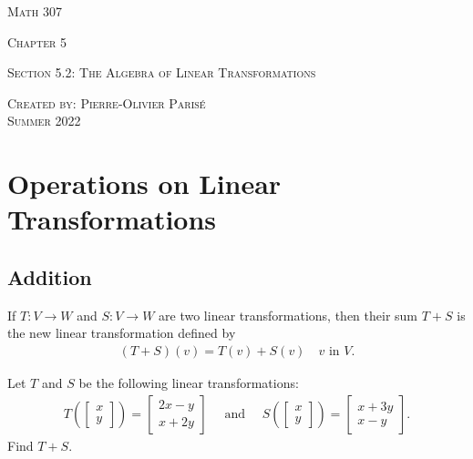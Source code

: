 \documentclass[12pt,a4paper]{article}
\newcounter{example}[section]
\begin{document}
\thispagestyle{empty}

\begin{center}
\vspace*{2.5cm}

{\Huge \textsc{Math 307}}

\vspace*{2cm}

{\LARGE \textsc{Chapter 5}} 

\vspace*{0.75cm}

\noindent\textsc{Section 5.2: The Algebra of Linear Transformations}

\vspace*{0.75cm}

\tableofcontents

\vfill

\noindent \textsc{Created by: Pierre-Olivier Paris{\'e}} \\
\textsc{Summer 2022}
\end{center}

\newpage

\section{Operations on Linear Transformations}

	\subsection{Addition}
	If $T : V \rightarrow W$ and $S : V \rightarrow W$ are two linear transformations, then their sum $T + S$ is the new linear transformation defined by
		\begin{align*}
		(T + S) (v) = T(v) + S(v) \quad v \text{ in } V .
		\end{align*}
		
	\begin{example}\label{Ex:AdditionOperators}
	Let $T$ and $S$ be the following linear transformations:
		\begin{align*}
		T \left( \begin{bmatrix}
		x \\ y
		\end{bmatrix} \right) = \begin{bmatrix}
		2x - y \\ x + 2y
		\end{bmatrix}
		\quad \text{ and } \quad
		S \left( \begin{bmatrix}
		x \\ y
		\end{bmatrix} \right) = \begin{bmatrix}
		x + 3y \\ x - y
		\end{bmatrix} .
		\end{align*}
	Find $T + S$.
	\end{example}
	
\end{document}
